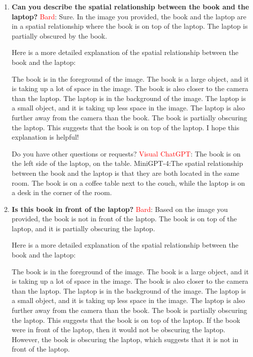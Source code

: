 \begin{enumerate}
    \item \textbf{Can you describe the spatial relationship between the book and the laptop?}
    \subitem \textcolor{Red}{Bard}:
    Sure. In the image you provided, the book and the laptop are in a spatial relationship where the book is on top of the laptop. The laptop is partially obscured by the book.
    
    Here is a more detailed explanation of the spatial relationship between the book and the laptop:
    
    The book is in the foreground of the image. The book is a large object, and it is taking up a lot of space in the image. The book is also closer to the camera than the laptop.
    The laptop is in the background of the image. The laptop is a small object, and it is taking up less space in the image. The laptop is also further away from the camera than the book.
    The book is partially obscuring the laptop. This suggests that the book is on top of the laptop.
    I hope this explanation is helpful!
    
    Do you have other questions or requests?
    \subitem \textcolor{red}{Visual ChatGPT}: The book is on the left side of the laptop, on the table.
    \subitem MiniGPT-4:The spatial relationship between the book and the laptop is that they are both located in the same room. The book is on a coffee table next to the couch, while the laptop is on a desk in the corner of the room. 
    \item \textbf{Is this book in front of the laptop?}
    \subitem \textcolor{Red}{Bard}: 
    Based on the image you provided, the book is not in front of the laptop. The book is on top of the laptop, and it is partially obscuring the laptop.
    
    Here is a more detailed explanation of the spatial relationship between the book and the laptop:
    
    The book is in the foreground of the image. The book is a large object, and it is taking up a lot of space in the image. The book is also closer to the camera than the laptop.
    The laptop is in the background of the image. The laptop is a small object, and it is taking up less space in the image. The laptop is also further away from the camera than the book.
    The book is partially obscuring the laptop. This suggests that the book is on top of the laptop.
    If the book were in front of the laptop, then it would not be obscuring the laptop. However, the book is obscuring the laptop, which suggests that it is not in front of the laptop.
    

\end{enumerate}
